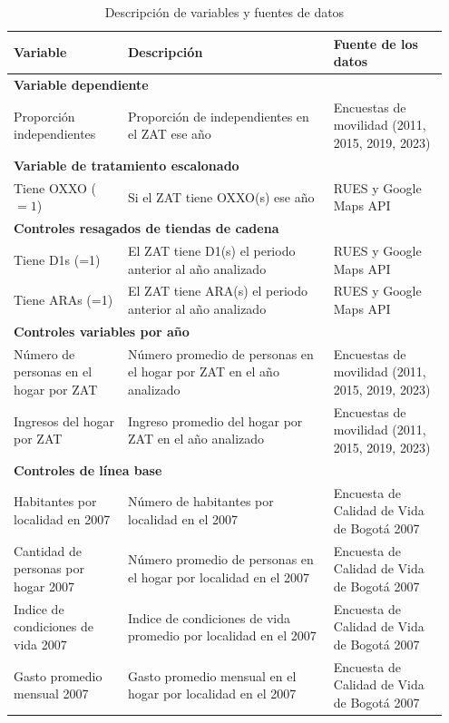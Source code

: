 \documentclass{article}
\begin{document}
\begin{longtable}{p{0.25\linewidth} p{0.45\linewidth} p{0.25\linewidth}}
\caption{Descripción de variables y fuentes de datos}
\label{tab:variables_descripcion}
\\
\toprule
\textbf{Variable} & \textbf{Descripción} & \textbf{Fuente de los datos} \\
\midrule
\endhead
\midrule
\multicolumn{3}{l}{\textbf{Variable dependiente}} \\
\midrule
Proporción independientes & Proporción de independientes en el ZAT ese año & Encuestas de movilidad (2011, 2015, 2019, 2023) \\
\midrule
\multicolumn{3}{l}{\textbf{Variable de tratamiento escalonado}} \\
\midrule
Tiene OXXO ($=1$) & Si el ZAT tiene OXXO(s) ese año & RUES y Google Maps API \\
\midrule
\multicolumn{3}{l}{\textbf{Controles resagados de tiendas de cadena}} \\
\midrule
Tiene D1s (=1) & El ZAT tiene D1(s) el periodo anterior al año analizado & RUES y Google Maps API \\
\midrule
Tiene ARAs (=1) & El ZAT tiene ARA(s) el periodo anterior al año analizado & RUES y Google Maps API \\
\midrule
\multicolumn{3}{l}{\textbf{Controles variables por año}} \\
\midrule
Número de personas en el hogar por ZAT & Número promedio de personas en el hogar por ZAT en el año analizado & Encuestas de movilidad (2011, 2015, 2019, 2023) \\
\midrule
Ingresos del hogar por ZAT & Ingreso promedio del hogar por ZAT en el año analizado & Encuestas de movilidad (2011, 2015, 2019, 2023) \\
\midrule
\multicolumn{3}{l}{\textbf{Controles de línea base}} \\
\midrule
Habitantes por localidad en 2007 & Número de habitantes por localidad en el 2007 & Encuesta de Calidad de Vida de Bogotá 2007 \\
\midrule
Cantidad de personas por hogar 2007 & Número promedio de personas en el hogar por localidad en el 2007 & Encuesta de Calidad de Vida de Bogotá 2007 \\
\midrule
Indice de condiciones de vida 2007 & Indice de condiciones de vida promedio por localidad en el 2007 & Encuesta de Calidad de Vida de Bogotá 2007 \\
\midrule
Gasto promedio mensual 2007 & Gasto promedio mensual en el hogar por localidad en el 2007 & Encuesta de Calidad de Vida de Bogotá 2007 \\

\end{longtable}
\end{document}
